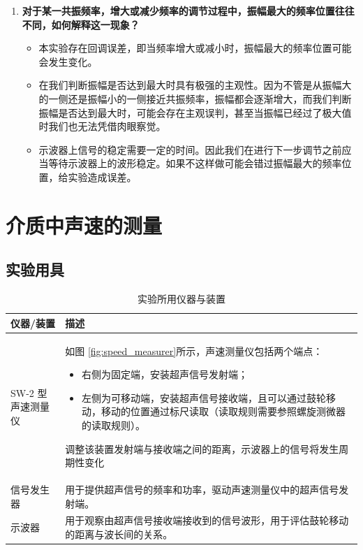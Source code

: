 \documentclass[zihao=5, UTF8]{article}
\theoremstyle{MyLineTheoremStyle} %
\theoremstyle{MyBlockTheoremStyle} %
\theoremstyle{MySubsubsectionStyle} %
\begin{document}
\begin{enumerate}
    \item \textbf{对于某一共振频率，增大或减少频率的调节过程中，振幅最大的频率位置往往不同，如何解释这一现象？} \\
    \begin{itemize}
      \item 本实验存在回调误差，即当频率增大或减小时，振幅最大的频率位置可能会发生变化。
      \item 在我们判断振幅是否达到最大时具有极强的主观性。因为不管是从振幅大的一侧还是振幅小的一侧接近共振频率，振幅都会逐渐增大，而我们判断振幅是否达到最大时，可能会存在主观误判，甚至当振幅已经过了极大值时我们也无法凭借肉眼察觉。
      \item 示波器上信号的稳定需要一定的时间。因此我们在进行下一步调节之前应当等待示波器上的波形稳定。如果不这样做可能会错过振幅最大的频率位置，给实验造成误差。
    \end{itemize}
\end{enumerate}

\section{介质中声速的测量}

\subsection{实验用具}

\begin{table}[H]
    \centering
    \begin{tabular}{p{3cm} p{10cm}}
        \toprule
        \textbf{仪器/装置} & \textbf{描述} \\
        \midrule
        SW-2 型声速测量仪 & 
        如图 \ref{fig:speed_measurer}所示，声速测量仪包括两个端点：
        \begin{itemize}
            \item 右侧为固定端，安装超声信号发射端；
            \item 左侧为可移动端，安装超声信号接收端，且可以通过鼓轮移动，移动的位置通过标尺读取（读取规则需要参照螺旋测微器的读取规则）。
        \end{itemize}
        调整该装置发射端与接收端之间的距离，示波器上的信号将发生周期性变化 \\
        \midrule
        信号发生器 & 
        用于提供超声信号的频率和功率，驱动声速测量仪中的超声信号发射端。 \\
        \midrule
        示波器 & 
        用于观察由超声信号接收端接收到的信号波形，用于评估鼓轮移动的距离与波长间的关系。 \\
        \bottomrule
    \end{tabular}
    \caption{实验所用仪器与装置}
    \label{tab:equipment_part_2}
\end{table}
\end{document}
